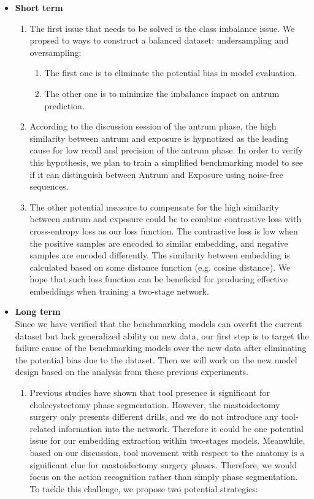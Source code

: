 \documentclass[11pt]{article} \usepackage[top=1in, bottom=1in, left=1in, right=1in]{geometry}
\begin{document}
\begin{itemize}
    \item \textbf{Short term}
    \begin{enumerate}
        \item The first issue that needs to be solved is the class imbalance issue. We propsed to ways to construct a balanced dataset: undersampling and oversampling:
        \begin{enumerate}
            \item The first one is to eliminate the potential bias in model evaluation.
            \item The other one is to minimize the imbalance impact on antrum prediction.
        \end{enumerate}
        \item According to the discussion session of the antrum phase, the high similarity between antrum and exposure is hypnotized as the leading cause for low recall and precision of the antrum phase. In order to verify this hypothesis, we plan to train a simplified benchmarking model to see if it can distinguish between Antrum and Exposure using noise-free sequences. 
        \item The other potential measure to compensate for the high similarity between antrum and exposure could be to combine contrastive loss with cross-entropy loss as our loss function. The contrastive loss is low when the positive samples are encoded to similar embedding, and negative samples are encoded differently. The similarity between embedding is calculated based on some distance function (e.g. cosine distance). We hope that such loss function can be beneficial for producing effective embeddings when training a two-stage network.
    \end{enumerate}
    \item \textbf{Long term}\\
    Since we have verified that the benchmarking models can overfit the current dataset but lack generalized ability on new data, our first step is to target the failure cause of the benchmarking models over the new data after eliminating the potential bias due to the dataset. Then we will work on the new model design based on the analysis from these previous experiments. 
    \begin{enumerate}
        \item Previous studies have shown that tool presence is significant for cholecystectomy phase segmentation\cite{EndoNet}. However, the mastoidectomy surgery only presents different drills, and we do not introduce any tool-related information into the network. Therefore it could be one potential issue for our embedding extraction within two-stages models. Meanwhile, based on our discussion, tool movement with respect to the anatomy is a significant clue for mastoidectomy surgery phases. Therefore, we would focus on the action recognition rather than simply phase segmentation. To tackle this challenge, we propose two potential strategies:

\end{enumerate}
\end{itemize}
\end{document}
